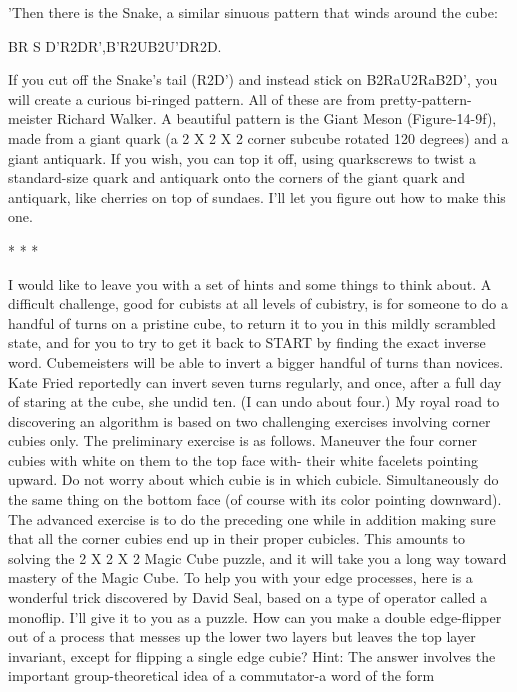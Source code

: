'Then there is the Snake, a similar sinuous pattern that winds around the cube:

       BR S D'R2DR',B'R2UB2U'DR2D.

If you cut off the Snake's tail (R2D') and instead stick on B2RaU2RaB2D', you will
create a curious bi-ringed pattern. All of these are from pretty-pattern-meister Richard
Walker. A beautiful pattern is the Giant Meson (Figure-14-9f), made from a giant
quark (a 2 X 2 X 2 corner subcube rotated 120 degrees) and a giant antiquark. If you
wish, you can top it off, using quarkscrews to twist a standard-size quark and
antiquark onto the corners of the giant quark and antiquark, like cherries on top of
sundaes. I'll let you figure out how to make this one.

                                       *   *   *

        I would like to leave you with a set of hints and some things to think about. A
difficult challenge, good for cubists at all levels of cubistry, is for someone to do a
handful of turns on a pristine cube, to return it to you in this mildly scrambled state,
and for you to try to get it back to START by finding the exact inverse word.
Cubemeisters will be able to invert a bigger handful of turns than novices. Kate Fried
reportedly can invert seven turns regularly, and once, after a full day of staring at the
cube, she undid ten. (I can undo about four.)
        My royal road to discovering an algorithm is based on two challenging
exercises involving corner cubies only. The preliminary exercise is as follows.
Maneuver the four corner cubies with white on them to the top face with- their white
facelets pointing upward. Do not worry about which cubie is in which cubicle.
Simultaneously do the same thing on the bottom face (of course with its color
pointing downward). The advanced exercise is to do the preceding one while in
addition making sure that all the corner cubies end up in their proper cubicles. This
amounts to solving the 2 X 2 X 2 Magic Cube puzzle, and it will take you a long way
toward mastery of the Magic Cube.
        To help you with your edge processes, here is a wonderful trick discovered by
David Seal, based on a type of operator called a monoflip. I'll give it to you as a
puzzle. How can you make a double edge-flipper out of a process that messes up the
lower two layers but leaves the top layer invariant, except for flipping a single edge
cubie? Hint: The answer involves the important group-theoretical idea of a
commutator-a word of the form




